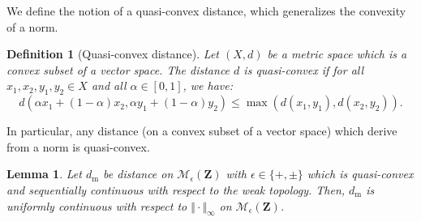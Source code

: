 \documentclass{amsart}
\theoremstyle{plain}
\newtheorem{lemme}[Th]{Lemma}
\newtheorem{defin}[Th]{Definition}
\theoremstyle{definition}
\newcommand{\Space}{\mathbf{Z}}
\newcommand{\cM}{\mathcal{M}}
\newcommand{\MeasEps}{\mathcal{M}_{\epsilon}(\Space)}
\newcommand{\TM}[1]{\norm{#1}_\infty}
\newcommand{\m}{\mathrm{m}}
\newcommand{\dmeas}{d_\m}
\newcommand{\norm}[1]{\Vert#1\Vert}
\begin{document}
We define the notion of a quasi-convex distance,
which generalizes the convexity of a norm.

 \begin{defin}[Quasi-convex distance]
 	\label{def_dist_quasi_convex}
Let $(X, d)$ be a metric space which is a convex subset of a vector space. 
The distance  $d$ is \emph{quasi-convex} if for all $x_1,x_2,y_1,y_2 \in X$
	and all $\alpha \in [0,1]$,
	we have: 
\[ d( \alpha x_1 + (1-\alpha) x_2, \alpha y_1 + (1-\alpha) y_2)
			\leq \max( d(x_1,y_1), d(x_2,y_2) ) . \]
\end{defin}

In particular, any distance (on a convex subset of a vector space) which
derive from a norm  is quasi-convex.


	
\begin{lemme}\label{lemma_unif_cont_TM}
Let $\dmeas$ be distance on $\MeasEps$ with $\epsilon\in\{  +, \pm\}$ 
	which is quasi-convex and sequentially continuous with respect to the weak topology.
Then, $\dmeas$ is uniformly continuous with respect to  $\TM{\cdot}$ on  $\cM_\epsilon(\Space)$.
\end{lemme}
\end{document}
